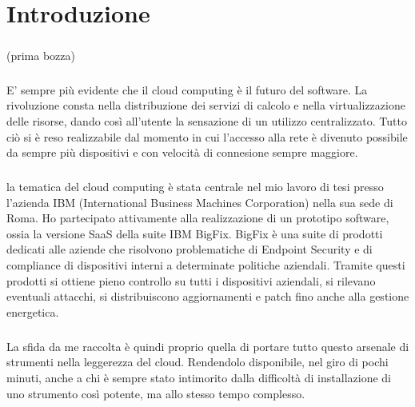 \chapter{Introduzione}

\paragraph{}
(prima bozza)

\paragraph{}
E' sempre più evidente che il cloud computing è il futuro del software. La rivoluzione consta nella distribuzione dei servizi di calcolo e nella virtualizzazione delle risorse, dando così all'utente la sensazione di un utilizzo centralizzato. Tutto ciò si è reso realizzabile dal momento in cui l'accesso alla rete è divenuto possibile da sempre più dispositivi e con velocità di connesione sempre maggiore.
\paragraph{}
la tematica del cloud computing è stata centrale nel mio lavoro di tesi presso l'azienda IBM (International Business Machines Corporation) nella sua sede di Roma. Ho partecipato attivamente alla realizzazione di un prototipo software, ossia la versione SaaS della suite IBM BigFix. BigFix è una suite di prodotti dedicati alle aziende che risolvono problematiche di Endpoint Security e di compliance di dispositivi interni a determinate politiche aziendali. Tramite questi prodotti si ottiene pieno controllo su tutti i dispositivi aziendali, si rilevano eventuali attacchi, si distribuiscono aggiornamenti e patch fino anche alla gestione energetica.
\paragraph{}
La sfida da me raccolta è quindi proprio quella di portare tutto questo arsenale di strumenti nella leggerezza del cloud. Rendendolo disponibile, nel giro di pochi minuti, anche a chi è sempre stato intimorito dalla difficoltà di installazione di uno strumento così potente, ma allo stesso tempo complesso.